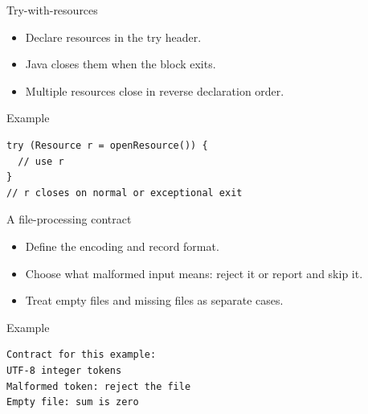 \documentclass[10pt,aspectratio=169]{beamer}
\begin{document}
\begin{frame}[fragile,t]{Try-with-resources}
\begin{itemize}
\item Declare resources in the try header.
\item Java closes them when the block exits.
\item Multiple resources close in reverse declaration order.
\end{itemize}
\vspace{1mm}\begin{block}{Example}
\begin{lstlisting}
try (Resource r = openResource()) {
  // use r
}
// r closes on normal or exceptional exit
\end{lstlisting}
\end{block}
\end{frame}

\begin{frame}[fragile,t]{A file-processing contract}
\begin{itemize}
\item Define the encoding and record format.
\item Choose what malformed input means: reject it or report and skip it.
\item Treat empty files and missing files as separate cases.
\end{itemize}
\vspace{1mm}\begin{block}{Example}
\begin{lstlisting}
Contract for this example:
UTF-8 integer tokens
Malformed token: reject the file
Empty file: sum is zero
\end{lstlisting}
\end{block}
\end{frame}
\end{document}
